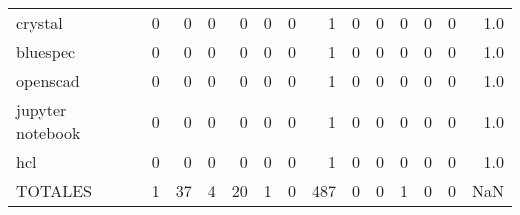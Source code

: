 \begin{tabular}{lrrrrrrrrrrrrr}
crystal          &        0 &       0 &          0 &               0 &                0 &       0 &          1 &         0 &         0 &      0 &             0 &         0 &      1.0 \\
bluespec         &        0 &       0 &          0 &               0 &                0 &       0 &          1 &         0 &         0 &      0 &             0 &         0 &      1.0 \\
openscad         &        0 &       0 &          0 &               0 &                0 &       0 &          1 &         0 &         0 &      0 &             0 &         0 &      1.0 \\
jupyter notebook &        0 &       0 &          0 &               0 &                0 &       0 &          1 &         0 &         0 &      0 &             0 &         0 &      1.0 \\
hcl              &        0 &       0 &          0 &               0 &                0 &       0 &          1 &         0 &         0 &      0 &             0 &         0 &      1.0 \\
TOTALES          &        1 &      37 &          4 &              20 &                1 &       0 &        487 &         0 &         0 &      1 &             0 &         0 &      NaN \\
\bottomrule
\end{tabular}

